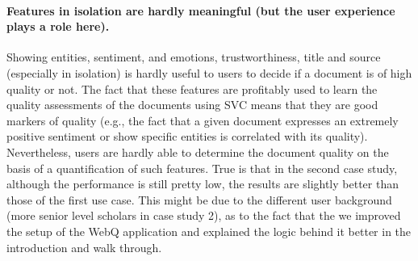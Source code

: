 \documentclass{llncs}
\begin{document}
\paragraph{{\bf Features in isolation are hardly meaningful (but the user experience plays a role here).}}
Showing entities, sentiment, and emotions, trustworthiness, title and source (especially in isolation) is hardly useful to users to decide if a document is of high quality or not. The fact that these features are profitably used to learn the quality assessments of the documents using SVC means that they are good markers of quality (e.g., the fact that a given document expresses an extremely positive sentiment or show specific entities is correlated with its quality). Nevertheless, users are hardly able to determine the document quality on the basis of a quantification of such features. True is that in the second case study, although the performance is still pretty low, the results are slightly better than those of the first use case. This might be due to the different user background (more senior level scholars in case study 2), as to the fact that the we improved the setup of the WebQ application and explained the logic behind it better in the introduction and walk through. 
%
%
%
\end{document}
